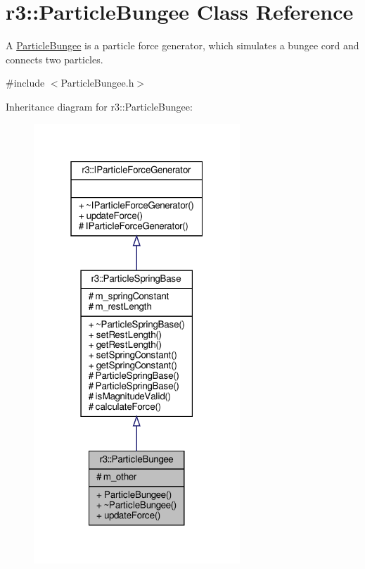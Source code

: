 \hypertarget{classr3_1_1_particle_bungee}{}\section{r3\+:\+:Particle\+Bungee Class Reference}
\label{classr3_1_1_particle_bungee}


A \mbox{\hyperlink{classr3_1_1_particle_bungee}{Particle\+Bungee}} is a particle force generator, which simulates a bungee cord and connects two particles.  




{\ttfamily \#include $<$Particle\+Bungee.\+h$>$}



Inheritance diagram for r3\+:\+:Particle\+Bungee\+:\nopagebreak
\begin{figure}[H]
\begin{center}
\leavevmode
\includegraphics[width=220pt]{classr3_1_1_particle_bungee__inherit__graph}
\end{center}
\end{figure}


